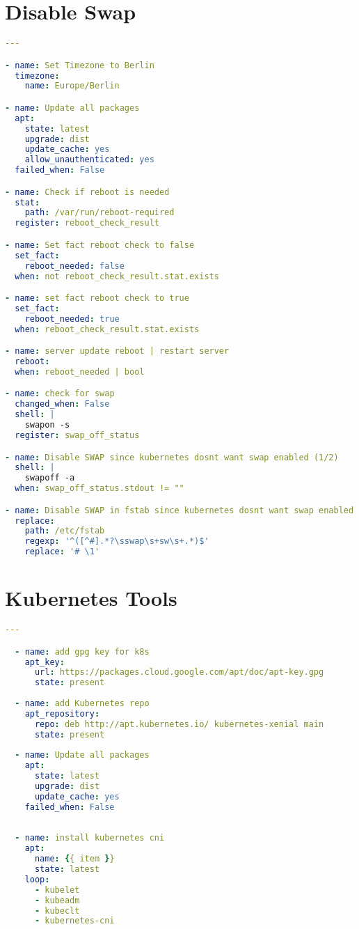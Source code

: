 \section{Disable Swap}
\hfill \newline
\label{app:base_role}
\begin{lstlisting}[language=yaml]
---

- name: Set Timezone to Berlin
  timezone:
    name: Europe/Berlin

- name: Update all packages
  apt:
    state: latest
    upgrade: dist
    update_cache: yes
    allow_unauthenticated: yes
  failed_when: False

- name: Check if reboot is needed
  stat:
    path: /var/run/reboot-required
  register: reboot_check_result

- name: Set fact reboot check to false
  set_fact:
    reboot_needed: false
  when: not reboot_check_result.stat.exists

- name: set fact reboot check to true
  set_fact:
    reboot_needed: true
  when: reboot_check_result.stat.exists

- name: server update reboot | restart server
  reboot:
  when: reboot_needed | bool

- name: check for swap
  changed_when: False
  shell: |
    swapon -s
  register: swap_off_status

- name: Disable SWAP since kubernetes dosnt want swap enabled (1/2)
  shell: |
    swapoff -a
  when: swap_off_status.stdout != ""

- name: Disable SWAP in fstab since kubernetes dosnt want swap enabled (2/2)
  replace:
    path: /etc/fstab
    regexp: '^([^#].*?\sswap\s+sw\s+.*)$'
    replace: '# \1'
\end{lstlisting}

\section{Kubernetes Tools}
\hfill \newline
\label{app:kube_tools}
\begin{lstlisting}[language=yaml]
  ---

  - name: add gpg key for k8s
    apt_key:
      url: https://packages.cloud.google.com/apt/doc/apt-key.gpg
      state: present
  
  - name: add Kubernetes repo
    apt_repository:
      repo: deb http://apt.kubernetes.io/ kubernetes-xenial main
      state: present
  
  - name: Update all packages
    apt:
      state: latest
      upgrade: dist
      update_cache: yes
    failed_when: False
  
  
  - name: install kubernetes cni
    apt:
      name: {{ item }}
      state: latest
    loop: 
      - kubelet
      - kubeadm
      - kubeclt
      - kubernetes-cni
\end{lstlisting}

